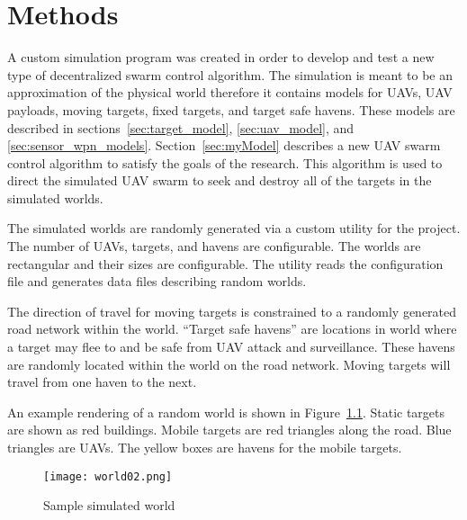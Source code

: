 \chapter{Methods}
\label{chap:worldScenModel}

A custom simulation program was created in order to develop and test a new type of decentralized swarm control algorithm. The simulation is meant to be an approximation of the physical world therefore it contains models for UAVs, UAV payloads, moving targets, fixed targets, and target safe havens.  These models are described in sections~\ref{sec:target_model}, \ref{sec:uav_model}, and \ref{sec:sensor_wpn_models}.  Section~\ref{sec:myModel} describes a new UAV swarm control algorithm to satisfy the goals of the research.  This algorithm is used to direct the simulated UAV swarm to seek and destroy all of the targets in the simulated worlds.

The simulated worlds are randomly generated via a custom utility for the project.  The number of UAVs, targets, and havens are configurable.  The worlds are rectangular and their sizes are configurable.  The utility reads the configuration file and generates data files describing random worlds.  


The direction of travel for moving targets is constrained to a randomly generated road network within the world.  ``Target safe havens'' are locations in world where a target may flee to and be safe from UAV attack and surveillance.  These havens are randomly located within the world on the road network.  Moving targets will travel from one haven to the next.

An example rendering of a random world is shown in Figure~\ref{fig:sample_world}. Static targets are shown as red buildings.  Mobile targets are red triangles along the road.  Blue triangles are UAVs.  The yellow boxes are havens for the mobile targets.




\begin{figure}[H]
	\centering
	\texttt{[image: world02.png]}
	\caption{Sample simulated world}
	\label{fig:sample_world}
\end{figure}



